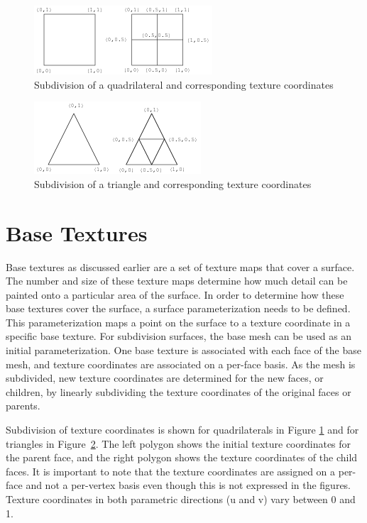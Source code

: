 \documentclass[10pt,twocolumn]{article}
\begin{document}
%
%
%

\begin{figure}
\begin{center}
\includegraphics{QuadTexSubd.png}
\caption{Subdivision of a quadrilateral and corresponding texture coordinates}
\label{QuadTexSub}
\end{center}
\end{figure}

\begin{figure}
\begin{center}
\includegraphics{TriTexSubd.png}
\caption{Subdivision of a triangle and corresponding texture coordinates}
\label{TriTexSub}
\end{center}
\end{figure}

\section{Base Textures}
\indent Base textures as discussed earlier 
are a set of texture maps that cover a surface.
The number and size of these texture maps determine how much detail 
can be painted onto a particular area of the surface. 
In order to determine how these base textures cover the
surface, a surface parameterization needs to be defined. 
This parameterization maps a point on the surface to a texture 
coordinate in a specific base texture.  For subdivision surfaces, 
the base mesh can be used as an initial parameterization.
One base texture is associated with each face of the base mesh, and 
texture coordinates are associated on a per-face basis. 
As the mesh is subdivided, new texture coordinates are determined 
for the new faces, or children, by linearly subdividing the texture 
coordinates of the original faces or parents. 

Subdivision of texture coordinates is shown for quadrilaterals in Figure 
\ref{QuadTexSub} and for triangles in Figure~\ref{TriTexSub}. 
The left polygon shows the initial texture coordinates for the parent face, 
and the right polygon shows the texture coordinates of the child faces.
It is important to note that the texture coordinates are assigned on a 
per-face and not a per-vertex basis even though this is not expressed in the 
figures.  Texture coordinates in both parametric directions (u and v) 
vary between 0 and 1.
\end{document}
